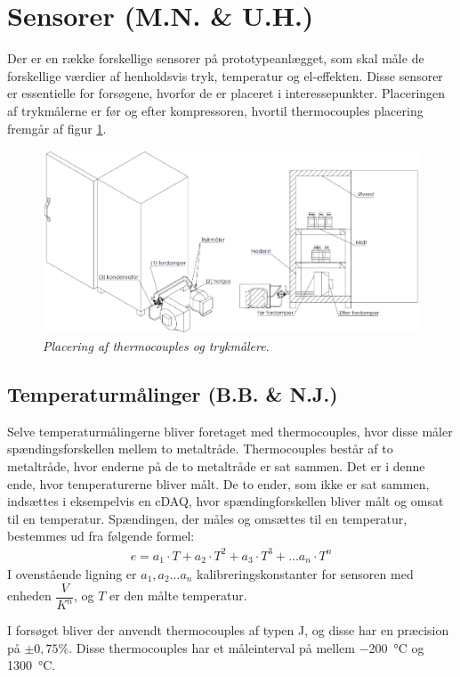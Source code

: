 \documentclass[../Hovedrapport.tex]{subfiles}
\begin{document}
\section{Sensorer (M.N. \& U.H.)}
Der er en række forskellige sensorer på prototypeanlægget, som skal måle de forskellige værdier af henholdsvis tryk, temperatur og el-effekten. Disse sensorer er essentielle for forsøgene, hvorfor de er placeret i interessepunkter. Placeringen af trykmålerne er før og efter kompressoren, hvortil thermocouples placering fremgår af figur \ref{fig:placthermo}.
\begin{figure}[H]
	\centering
	\includegraphics[width=1\textwidth]{Billeder/maalerplacering.png}
	\caption{\textit{Placering af thermocouples og trykmålere}.}
	\label{fig:placthermo}
\end{figure}

\subsection{Temperaturmålinger (B.B. \& N.J.)}
Selve temperaturmålingerne bliver foretaget med thermocouples, hvor disse måler spændingsforskellen mellem to metaltråde. Thermocouples består af to metaltråde, hvor enderne på de to metaltråde er sat sammen. Det er i denne ende, hvor temperaturerne bliver målt. De to ender, som ikke er sat sammen, indsættes i eksempelvis en cDAQ, hvor spændingforskellen bliver målt og omsat til en temperatur. Spændingen, der måles og omsættes til en temperatur, bestemmes ud fra følgende formel:
\begin{align}
    e=a_1\cdot T+a_2\cdot T^2+a_3 \cdot T^3+...a_n\cdot T^n
\end{align}
I ovenstående ligning er $a_1,a_2...a_n$ kalibreringskonstanter for sensoren med enheden $\dfrac{V}{K^n}$, og $T$ er den målte temperatur.

I forsøget bliver der anvendt thermocouples af typen J, og disse har en præcision på $\pm 0,75\%$. Disse thermocouples har et måleinterval på mellem \SI{-200}{\celsius} og \SI{+1300}{\celsius}. 
\end{document}
